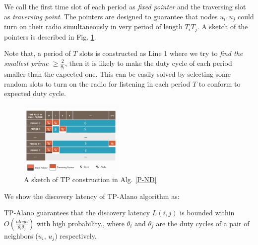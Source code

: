We call the first time slot of each period as \emph{fixed pointer} and the traversing
slot as \emph{traversing point}. The pointers are designed to guarantee that nodes $u_i, u_j$
could turn on their radio simultaneously in very period of length $T_i T_j$. A sketch of the pointers is described in Fig. \ref{TP}.

Note that, a period of $T$ slots is constructed as Line 1 where we try to \emph{find the smallest prime $\geq \frac{2}{\theta_i}$},
then it is likely to make the duty cycle of each period smaller than the expected one. This can be easily solved by selecting some random slots to turn on the radio for listening in each period $T$ to conform to expected duty cycle.


\begin{figure}[!h]
\centering
\includegraphics[width=2in]{./Figure/TP}
\caption{A sketch of TP construction in Alg. \ref{P-ND}}
\label{TP}
\end{figure}

We show the discovery latency of TP-Alano algorithm as:


\begin{theorem}
\label{PBND1}
TP-Alano guarantees that the discovery latency $L(i,j)$
is bounded within $O(\frac{nlogn}{\theta_i\theta_j})$ with high probability.,
where $\theta_i$ and $\theta_j$ are the duty cycles of
a pair of neighbors ($u_i$, $u_j$) respectively.
\end{theorem}



